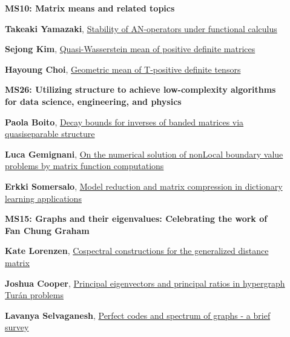 \documentclass[ILAS2025-program.tex]{subfiles}
\begin{document}
\begin{description}
    \begin{description}
    \item[] {\color{mstitle}\textbf{MS10: Matrix means and related topics}} 
    \item[] \hypertarget{up0022}{}\textbf{Takeaki Yamazaki}, \hyperlink{down0022}{Stability of AN-operators under functional calculus}
        \item[] \hypertarget{up0023}{}\textbf{Sejong Kim}, \hyperlink{down0023}{Quasi-Wasserstein mean of positive definite matrices}
        \item[] \hypertarget{up0024}{}\textbf{Hayoung Choi}, \hyperlink{down0024}{Geometric mean of T-positive definite tensors}
        \end{description}
    \begin{description}
    \item[] {\color{mstitle}\textbf{MS26: Utilizing structure to achieve low-complexity algorithms for data science, engineering, and physics}} 
    \item[] \hypertarget{up0025}{}\textbf{Paola Boito}, \hyperlink{down0025}{Decay bounds for inverses of banded matrices via quasiseparable structure}
        \item[] \hypertarget{up0026}{}\textbf{Luca Gemignani}, \hyperlink{down0026}{On the numerical solution of nonLocal boundary value problems by matrix function computations}
        \item[] \hypertarget{up0027}{}\textbf{Erkki Somersalo}, \hyperlink{down0027}{Model reduction and matrix compression in dictionary learning applications}
        \end{description}
    \begin{description}
    \item[] {\color{mstitle}\textbf{MS15: Graphs and their eigenvalues: Celebrating the work of Fan Chung Graham}} 
    \item[] \hypertarget{up0028}{}\textbf{Kate Lorenzen}, \hyperlink{down0028}{Cospectral constructions for the generalized distance matrix}
        \item[] \hypertarget{up0029}{}\textbf{Joshua Cooper}, \hyperlink{down0029}{Principal eigenvectors and principal ratios in hypergraph Tur\'{a}n problems}
        \item[] \hypertarget{up0030}{}\textbf{Lavanya Selvaganesh}, \hyperlink{down0030}{Perfect codes and spectrum of graphs - a brief survey
}
\end{description}
\end{description}
\end{document}

